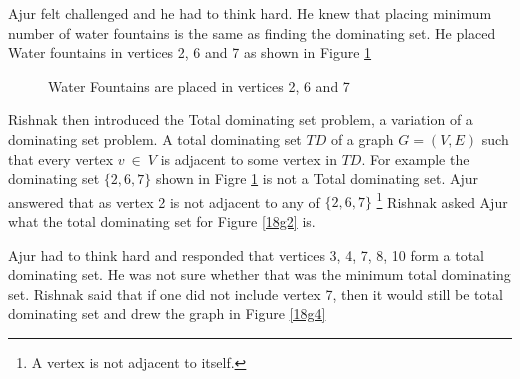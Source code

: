 Ajur felt challenged and he had to think hard. He knew that placing minimum number of water fountains is the same as finding the dominating set. He placed Water fountains in vertices 2, 6 and 7 as shown in Figure \ref{18g3}

\begin{figure}
\begin{center}

\caption{Water Fountains are placed in vertices 2, 6 and 7 }\label{18g3}
\end{center}
\end{figure}

Rishnak then introduced the Total dominating set problem, a variation of a dominating set problem. A total dominating set $TD$ of a graph $G=(V,E)$ such that every vertex $v~\in~V$ is adjacent to some vertex in $TD$. For example the dominating set $\{2,6,7\}$ shown in Figre \ref{18g3} is not a Total dominating set. Ajur answered that as vertex 2 is not adjacent to any of $\{2,6,7\}$ \footnote{A vertex is not adjacent to itself.} Rishnak asked Ajur what the total dominating set for Figure \ref{18g2} is.

Ajur had to think hard and responded that vertices 3, 4, 7, 8, 10 form a total dominating set. He was not sure whether that was the minimum total dominating set. Rishnak said that if one did not include vertex 7, then it would still be total dominating set and drew the graph in Figure \ref{18g4}

